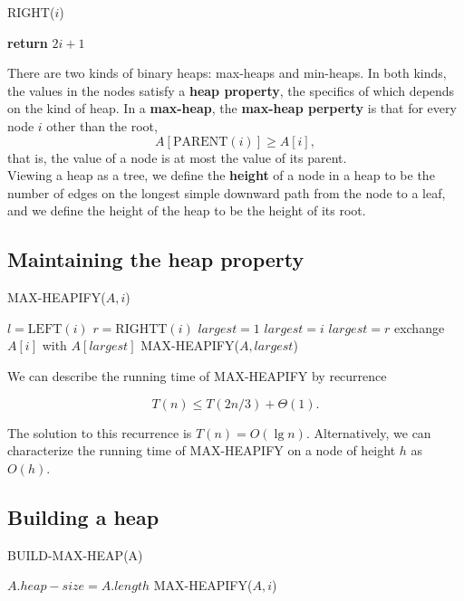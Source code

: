 \documentclass[12pt]{article}
\begin{document}
RIGHT($i$)
\begin{algorithmic}[1]
\State \textbf {return} $2i+1$
\end{algorithmic}

There are two kinds of binary heaps: max-heaps and min-heaps. In both kinds, the values in the nodes satisfy a {\bf heap property}, the specifics of which depends on the kind of heap. In a {\bf max-heap}, the {\bf max-heap perperty} is that for every node $i$ other than the root,
\begin{equation*}
  A[\text{PARENT}(i)] \ge A[i],
\end{equation*}
that is, the value of a node is at most the value of its parent. \\

Viewing a heap as a tree, we define the {\bf height} of a node in a heap to be the number of edges on the longest simple downward path from the node to a leaf, and we define the height of the heap to be the height of its root.

\subsection{Maintaining the heap property}

 MAX-HEAPIFY($A,i$)
\begin{algorithmic}[1]
\State $l = \text {LEFT}(i)$
\State $r = \text {RIGHTT}(i)$
	\State $largest = 1$
\Else
	\State $largest = i$
\EndIf
{}
	\State $largest = r$
\EndIf
{}
	\State exchange $A[i]$ with $A[largest]$
        \State MAX-HEAPIFY($A, largest$)
\EndIf
\end{algorithmic}

We can describe the running time of MAX-HEAPIFY by recurrence

\begin{equation*}
  T(n) \le T(2n/3) + \Theta(1).
\end{equation*}

The solution to this recurrence is $T(n) = O(\lg n)$. Alternatively, we can characterize the running time of MAX-HEAPIFY on a node of height $h$ as $O(h)$.

\subsection{Building a heap}

BUILD-MAX-HEAP(A)
\begin{algorithmic}[1]
\State $A.heap-size = A.length$
	\State MAX-HEAPIFY($A, i$)
\EndFor
\end{algorithmic}
\end{document}
